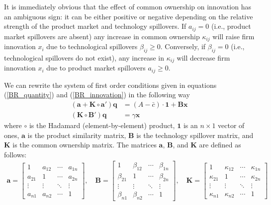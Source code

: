 \documentclass[12pt]{article}
\begin{document}
It is immediately obvious that the effect of common ownership on innovation has an ambiguous sign: it can be either positive or negative depending on the relative strength of the product market and technology spillovers. If $a_{ij} = 0$ (i.e., product market spillovers are absent) any increase in common ownership $\kappa_{ij}$ will raise firm innovation $x_{i}$ due to technological spillovers $\beta_{ij} \geq 0$. Conversely, if $\beta_{ij} = 0$ (i.e., technological spillovers do not exist), any increase in $\kappa_{ij}$ will decrease firm innovation $x_{i}$ due to product market spillovers $a_{ij} \geq 0$.

We can rewrite the system of first order conditions given in equations (\ref{BR_quantity}) and (\ref{BR_innovation}) in the following way
\begin{align*}
    \left(\mathbf{a} + \mathbf{K} \circ \mathbf{a}'\right) \mathbf{q} &= (A-\bar{c}) \cdot \mathbf{1} + \mathbf{B} \mathbf{x} \\
    \left(\mathbf{K} \circ \mathbf{B}'\right) \mathbf{q} &= \gamma \mathbf{x}
\end{align*}
where $\circ$ is the Hadamard (element-by-element) product, $\mathbf{1}$ is an $n \times 1$ vector of ones, $\mathbf{a}$ is the product similarity matrix, $\mathbf{B}$ is the technology spillover matrix, and $\mathbf{K}$ is the common ownership matrix. The matrices $\mathbf{a}$, $\mathbf{B}$, and $\mathbf{K}$ are defined as follows:
\begin{align*}
    \mathbf{a} = \begin{bmatrix}
	1 & a_{12} & \cdots & a_{1n}\\
	a_{21} & 1  & \cdots & a_{2n}\\
	\vdots & \vdots &\ddots &\vdots \\
	a_{n1} & a_{n2}& \cdots& 1
	\end{bmatrix}, \quad
    \mathbf{B} = \begin{bmatrix}
	1 & \beta_{12} & \cdots & \beta_{1n}\\
	\beta_{21} & 1  & \cdots & \beta_{2n}\\
	\vdots & \vdots &\ddots &\vdots \\
	\beta_{n1} & \beta_{n2}& \cdots& 1
	\end{bmatrix}, \quad
    \mathbf{K} = \begin{bmatrix}
	1 & \kappa_{12} & \cdots & \kappa_{1n}\\
	\kappa_{21} & 1  & \cdots & \kappa_{2n}\\
	\vdots & \vdots &\ddots &\vdots \\
	\kappa_{n1} & \kappa_{n2}& \cdots& 1
	\end{bmatrix}
\end{align*}
\end{document}
